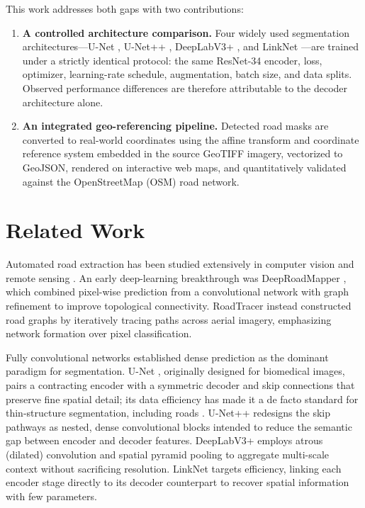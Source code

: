 \documentclass[conference]{IEEEtran}
\begin{document}
This work addresses both gaps with two contributions:
\begin{enumerate}
  \item \textbf{A controlled architecture comparison.} Four widely used
  segmentation architectures---U-Net \cite{ronneberger2015unet}, U-Net++
  \cite{zhou2018unetpp}, DeepLabV3+ \cite{chen2018deeplabv3plus}, and LinkNet
  \cite{chaurasia2017linknet}---are trained under a strictly identical
  protocol: the same ResNet-34 encoder, loss, optimizer, learning-rate
  schedule, augmentation, batch size, and data splits. Observed performance
  differences are therefore attributable to the decoder architecture alone.
  \item \textbf{An integrated geo-referencing pipeline.} Detected road masks
  are converted to real-world coordinates using the affine transform and
  coordinate reference system embedded in the source GeoTIFF imagery,
  vectorized to GeoJSON, rendered on interactive web maps, and quantitatively
  validated against the OpenStreetMap (OSM) road network.
\end{enumerate}

\section{Related Work}
Automated road extraction has been studied extensively in computer vision and
remote sensing \cite{mnih2010learning,mnih2013thesis,cheng2016survey}. An early
deep-learning breakthrough was DeepRoadMapper \cite{mattyus2017deeproadmapper},
which combined pixel-wise prediction from a convolutional network with graph
refinement to improve topological connectivity. RoadTracer
\cite{bastani2018roadtracer} instead constructed road graphs by iteratively
tracing paths across aerial imagery, emphasizing network formation over pixel
classification.

Fully convolutional networks \cite{long2015fcn} established dense prediction
as the dominant paradigm for segmentation. U-Net \cite{ronneberger2015unet},
originally designed for biomedical images, pairs a contracting encoder with a
symmetric decoder and skip connections that preserve fine spatial detail; its
data efficiency has made it a de facto standard for thin-structure
segmentation, including roads \cite{zhang2018resunet}. U-Net++
\cite{zhou2018unetpp} redesigns the skip pathways as nested, dense
convolutional blocks intended to reduce the semantic gap between encoder and
decoder features. DeepLabV3+ \cite{chen2017rethinking,chen2018deeplabv3plus}
employs atrous (dilated) convolution and spatial pyramid pooling to aggregate
multi-scale context without sacrificing resolution. LinkNet
\cite{chaurasia2017linknet} targets efficiency, linking each encoder stage
directly to its decoder counterpart to recover spatial information with few
parameters.
\end{document}
